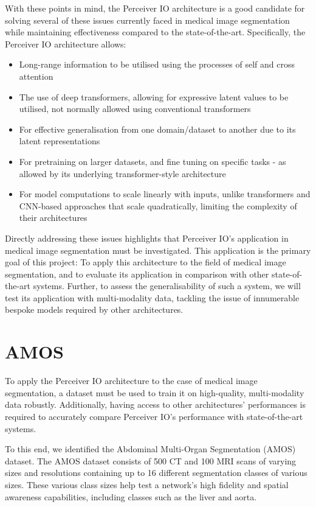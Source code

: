 \documentclass{l4proj}
\begin{document}
With these points in mind, the Perceiver IO architecture is a good candidate for solving several of these issues currently faced in medical image segmentation while maintaining effectiveness compared to the state-of-the-art. Specifically, the Perceiver IO architecture allows:

\begin{itemize}
  \item{Long-range information to be utilised using the processes of self and cross attention}
  \item{The use of deep transformers, allowing for expressive latent values to be utilised, not normally allowed using conventional transformers}
  \item{For effective generalisation from one domain/dataset to another due to its latent representations}
  \item{For pretraining on larger datasets, and fine tuning on specific tasks - as allowed by its underlying transformer-style architecture}
  \item{For model computations to scale linearly with inputs, unlike transformers and CNN-based approaches that scale quadratically, limiting the complexity of their architectures}
\end{itemize}

Directly addressing these issues highlights that Perceiver IO’s application in medical image segmentation must be investigated. This application is the primary goal of this project: To apply this architecture to the field of medical image segmentation, and to evaluate its application in comparison with other state-of-the-art systems. Further, to assess the generalisability of such a system, we will test its application with multi-modality data, tackling the issue of innumerable bespoke models required by other architectures.

    \section{AMOS}

To apply the Perceiver IO architecture to the case of medical image segmentation, a dataset must be used to train it on high-quality, multi-modality data robustly. Additionally, having access to other architectures’ performances is required to accurately compare Perceiver IO’s performance with state-of-the-art systems.

To this end, we identified the Abdominal Multi-Organ Segmentation (AMOS) dataset. The AMOS dataset consists of 500 CT and 100 MRI scans of varying sizes and resolutions containing up to 16 different segmentation classes of various sizes. These various class sizes help test a network's high fidelity and spatial awareness capabilities, including classes such as the liver and aorta.
\end{document}
